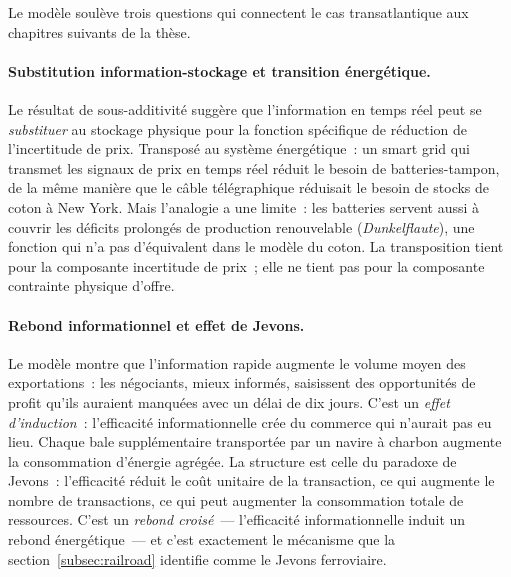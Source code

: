 Le modèle soulève trois questions qui connectent le cas transatlantique aux chapitres suivants de la thèse.

\paragraph{Substitution information-stockage et transition énergétique.} Le résultat de sous-additivité suggère que l'information en temps réel peut se \emph{substituer} au stockage physique pour la fonction spécifique de réduction de l'incertitude de prix. Transposé au système énergétique~: un smart grid qui transmet les signaux de prix en temps réel réduit le besoin de batteries-tampon, de la même manière que le câble télégraphique réduisait le besoin de stocks de coton à New York. Mais l'analogie a une limite~: les batteries servent aussi à couvrir les déficits prolongés de production renouvelable (\emph{Dunkelflaute}), une fonction qui n'a pas d'équivalent dans le modèle du coton. La transposition tient pour la composante incertitude de prix~; elle ne tient pas pour la composante contrainte physique d'offre. 

\paragraph{Rebond informationnel et effet de Jevons.} Le modèle montre que l'information rapide augmente le volume moyen des exportations~: les négociants, mieux informés, saisissent des opportunités de profit qu'ils auraient manquées avec un délai de dix jours. C'est un \emph{effet d'induction}~: l'efficacité informationnelle crée du commerce qui n'aurait pas eu lieu. Chaque bale supplémentaire transportée par un navire à charbon augmente la consommation d'énergie agrégée. La structure est celle du paradoxe de Jevons~: l'efficacité réduit le coût unitaire de la transaction, ce qui augmente le nombre de transactions, ce qui peut augmenter la consommation totale de ressources. C'est un \emph{rebond croisé}~--- l'efficacité informationnelle induit un rebond énergétique~--- et c'est exactement le mécanisme que la section~\ref{subsec:railroad} identifie comme le \og Jevons ferroviaire\fg{}. 


